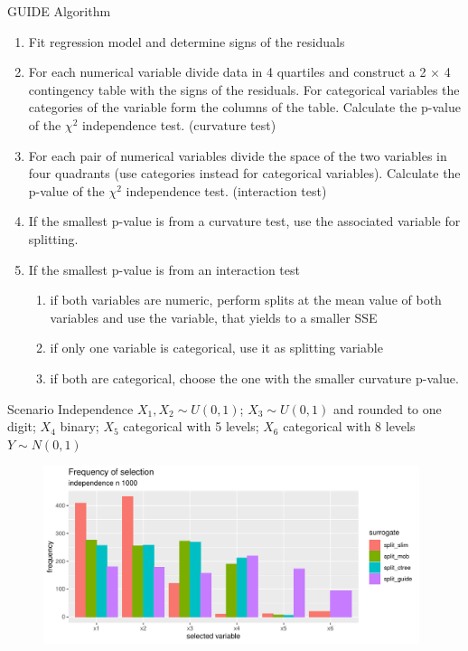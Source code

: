 \documentclass[9pt, xcolor=table]{beamer}
\begin{document}
\begin{frame}{GUIDE}
Algorithm \citep{.2002}
\begin{enumerate}
    \item Fit regression model and determine signs of the residuals
    \item For each numerical variable divide data in 4 quartiles and construct a 2 × 4 contingency table with the signs of the residuals. For categorical variables the categories of the variable form the columns of the table. Calculate the p-value of the  $\chi^2$ independence test. (curvature test)
    \item For each pair of numerical variables divide the space of the two variables in four quadrants (use categories instead for categorical variables). Calculate the p-value of the  $\chi^2$ independence test. (interaction test)
    \item If the smallest p-value is from a curvature test, use the associated variable for splitting.
    \item If the smallest p-value is from an interaction test 
    \begin{enumerate}
        \item if both variables are numeric, perform splits at the mean value of both variables and use the variable, that yields to a smaller SSE
        \item if only one variable is categorical, use it as splitting variable
        \item if both are categorical, choose the one with the smaller curvature p-value.
    \end{enumerate}
\end{enumerate}
    
\end{frame}


\begin{frame}{Scenario Independence}
$X_{1}, X_{2} \sim U(0,1)$; 
$X_{3} \sim U(0,1)$ and rounded to one digit;
$X_{4}$ binary;
$X_{5}$ categorical with 5 levels;
$X_{6}$ categorical with 8 levels\\
$Y \sim N(0,1)$

\begin{figure}
    \includegraphics[width=11cm]{Figures/simulations/batchtools/selection_bias_general/independence_n1000.pdf}
\end{figure}
\end{frame}
\end{document}
